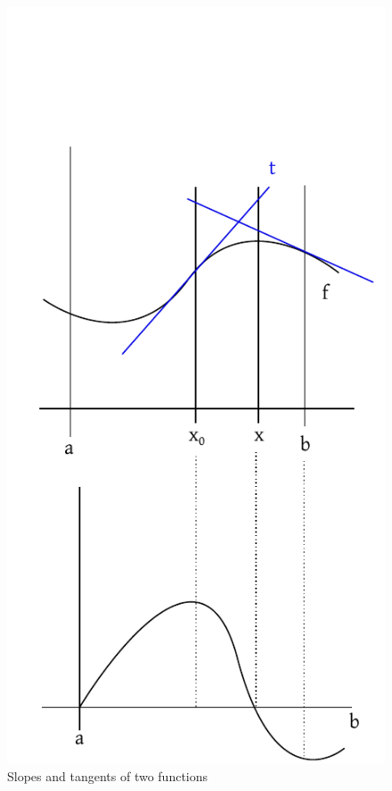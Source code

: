\documentclass[a4paper,landscape,twocolumn]{article}
\theoremstyle{definition}
\begin{document}
\begin{figure}[!h]
  \begin{center}
    \includegraphics{img/slopes.pdf}
    \caption{Slopes and tangents of two functions}
    \label{img:slopes-and-tangents}
  \end{center}
\end{figure}
\end{document}
